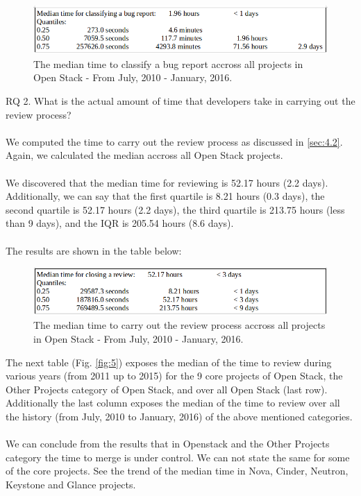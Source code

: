 \documentclass[ifip]{svmult}
\begin{document}
\begin{figure}[H]
\centering

\includegraphics[width=1.0\textwidth,natwidth=779,natheight=129]{t-c.png}

\caption{The median time to classify a bug report accross all projects in Open Stack - From July, 2010 - January, 2016.}
\label{fig:3}       
\end{figure}

RQ 2. What is the actual amount of time that developers take in carrying out the review process?
\\
\\
We computed the time to carry out the review process as discussed in \ref{sec:4.2}.
\\
Again, we calculated the median accross all Open Stack projects. 
\\
\\
We discovered that the median time for reviewing is 52.17 hours (2.2 days). Additionally, we can say that the 
first quartile is 8.21 hours (0.3 days), 
the second quartile is 52.17 hours (2.2 days), the third quartile is 213.75 hours (less than 9 days), 
and the IQR is 205.54 hours (8.6 days).
\\
\\
The results are shown in the table below:

\begin{figure}[H]
\centering

\includegraphics[width=1.0\textwidth,natwidth=779,natheight=129]{t-r1.png}

\caption{The median time to carry out the review process accross all projects in Open Stack - From July, 2010 - January, 2016.}
\label{fig:4} 
\end{figure}

The next table (Fig. \ref{fig:5}) exposes the median of the time to review during various years (from 2011 up to 2015) 
for the 9 core projects of Open Stack, the 
Other Projects category of Open Stack, and over all Open Stack (last row). Additionally the last column exposes the median 
of the time to review over all the history (from July, 2010 to January, 2016) of the above mentioned categories.
\\
\\
We can conclude from the results that in Openstack and the Other Projects category the time to merge is under control.
We can not state the same for some of the core projects. See the trend of the median time in Nova, Cinder, Neutron, Keystone 
and Glance projects.
\end{document}
